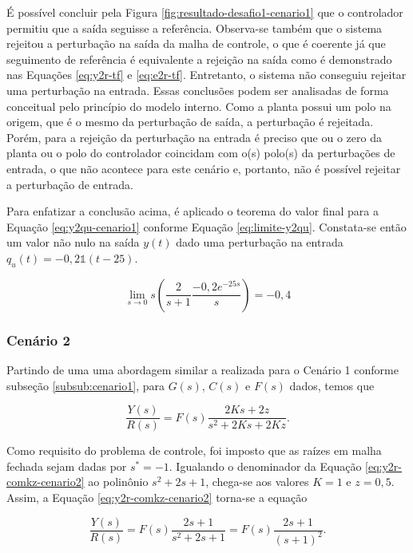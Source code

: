 É possível concluir pela Figura \ref{fig:resultado-desafio1-cenario1} que o
controlador permitiu que a saída seguisse a referência. Observa-se também que o
sistema rejeitou a perturbação na saída da malha de controle, o que é coerente
já que seguimento de referência é equivalente a rejeição na saída como é
demonstrado nas Equações \ref{eq:y2r-tf} e \ref{eq:e2r-tf}. Entretanto, o
sistema não conseguiu rejeitar uma perturbação na entrada. Essas conclusões
podem ser analisadas de forma conceitual pelo princípio do modelo interno. Como
a planta possui um polo na origem, que é o mesmo da perturbação de saída, a
perturbação é rejeitada. Porém, para a rejeição da perturbação na entrada é
preciso que ou o zero da planta ou o polo do controlador coincidam com o(s)
polo(s) da perturbações de entrada, o que não acontece para este cenário e,
portanto, não é possível rejeitar a perturbação de entrada.

Para enfatizar a conclusão acima, é aplicado o teorema do valor final para a
Equação \ref{eq:y2qu-cenario1} conforme Equação \ref{eq:limite-y2qu}.
Constata-se então um valor não nulo na saída $y(t)$ dado uma perturbação na
entrada $q_{u}(t) = -0,2\mathds{1}(t - 25)$.

\begin{equation}
    \label{eq:limite-y2qu}
    \lim_{s \rightarrow 0}s\left ( \frac{2}{s + 1}\frac{-0,2e^{-25s}}{s} \right ) = -0,4
\end{equation}

\subsubsection{Cenário 2}
Partindo de uma uma abordagem similar a realizada para o Cenário 1 conforme
subseção \ref{subsub:cenario1}, para $G(s)$, $C(s)$ e $F(s)$ dados, temos que

\begin{equation}
    \label{eq:y2r-comkz-cenario2}
    \frac{Y(s)}{R(s)} = F(s)\frac{2Ks + 2z}{s^2 + 2Ks + 2Kz}.
\end{equation}

Como requisito do problema de controle, foi imposto que as raízes em malha
fechada sejam dadas por $s^* = -1$. Igualando o denominador da Equação
\ref{eq:y2r-comkz-cenario2} ao polinônio $s^2 + 2s + 1$, chega-se aos valores
$K = 1$ e $z = 0,5$. Assim, a Equação \ref{eq:y2r-comkz-cenario2} torna-se 
a equação

\begin{equation}
    \label{eq:y2r-semkz-cenario2}
    \frac{Y(s)}{R(s)} = F(s)\frac{2s + 1}{s^2 + 2s + 1}
    = F(s)\frac{2s + 1}{(s+1)^2}.
\end{equation}

